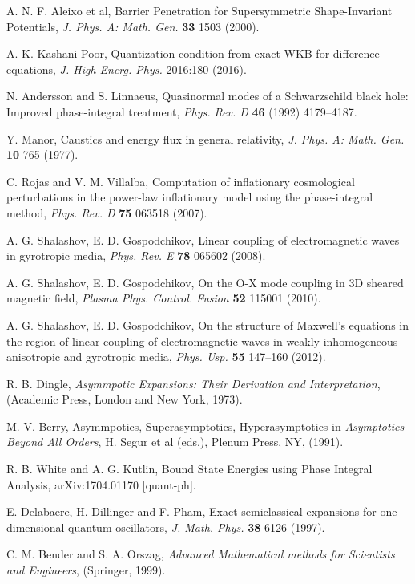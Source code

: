 \documentclass[asy]{iosart2x}
\begin{document}
\begin{thebibliography}{30}
 A. N. F. Aleixo et al, 
Barrier Penetration for Supersymmetric Shape-Invariant Potentials,
\textit{J. Phys. A: Math. Gen.} \textbf{33} 1503 (2000).

 A. K. Kashani-Poor, 
Quantization condition from exact WKB for difference equations,
\textit{J. High Energ. Phys.} 2016:180 (2016).

 N. Andersson and S. Linnaeus, 
Quasinormal modes of a Schwarzschild black hole: Improved phase-integral treatment,
\textit{Phys. Rev. D} \textbf{46} (1992) 4179--4187.

 Y. Manor, 
Caustics and energy flux in general relativity,
\textit{J. Phys. A: Math. Gen.} \textbf{10} 765 (1977).

 C. Rojas and V. M. Villalba, 
Computation of inflationary cosmological perturbations in the power-law inflationary model using the phase-integral method,
\textit{Phys. Rev. D} \textbf{75} 063518 (2007).

 A. G. Shalashov,  E. D. Gospodchikov,
Linear coupling of electromagnetic waves in gyrotropic media, 
\textit{Phys. Rev. E} \textbf{78} 065602 (2008).

 A. G. Shalashov, E. D. Gospodchikov, 
On the O-X mode coupling in 3D sheared magnetic field,
\textit{Plasma Phys. Control. Fusion} \textbf{52} 115001 (2010). 

 A. G. Shalashov, E. D. Gospodchikov, 
On the structure of Maxwell's equations in the region of 
linear coupling of electromagnetic waves in weakly
inhomogeneous anisotropic and gyrotropic media,
\textit{Phys. Usp.} \textbf{55} 147--160 (2012).

 R. B. Dingle, 
\textit{Asymmpotic Expansions: Their Derivation and Interpretation}, 
(Academic Press, London and New York, 1973).

 M. V. Berry, 
Asymmpotics, Superasymptotics, Hyperasymptotics in 
\textit{Asymptotics Beyond All Orders}, 
H. Segur et al (eds.), Plenum Press, NY, (1991).

 R. B. White and A. G. Kutlin, 	
Bound State Energies using Phase Integral Analysis,
arXiv:1704.01170 [quant-ph].

 E. Delabaere, H. Dillinger and F. Pham, 
Exact semiclassical expansions for one-dimensional quantum oscillators,
\textit{J. Math. Phys.} \textbf{38} 6126 (1997).

 C. M. Bender and S. A. Orszag, 
\textit{Advanced Mathematical methods for Scientists and Engineers}, 
(Springer, 1999).


\end{thebibliography}
\end{document}

